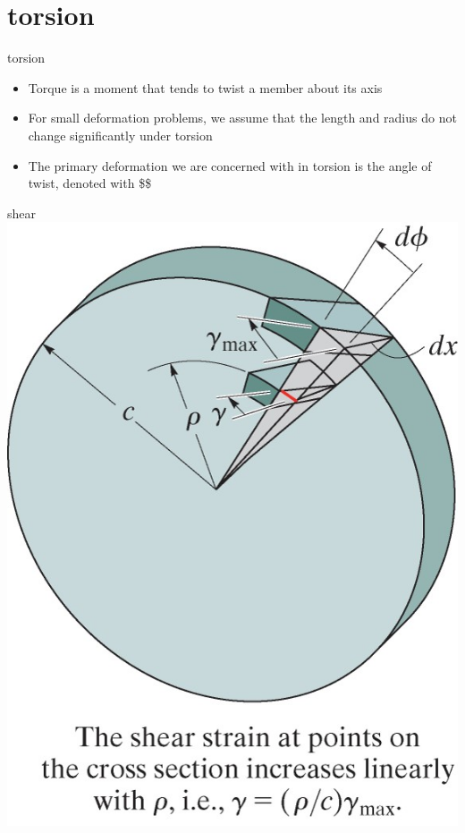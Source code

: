 \documentclass[
  letterpaper,
  ignorenonframetext,
  aspectratio=43,
  handout,
  12pt]{beamer}
\providecommand{\tightlist}{%
  \setlength{\itemsep}{0pt}\setlength{\parskip}{0pt}}
\providecommand{\tightlist}{%
\setlength{\itemsep}{0pt}\setlength{\parskip}{0pt}}
\let\Oldincludegraphics\includegraphics
\renewcommand{\includegraphics}[2][]{\Oldincludegraphics[width=\textwidth,height=0.7\textheight,keepaspectratio]{#2}}
\begin{document}
\hypertarget{torsion}{%
\section{torsion}\label{torsion}}

\begin{frame}{torsion}
\protect\hypertarget{torsion-1}{}
\begin{itemize}
\tightlist
\item
  Torque is a moment that tends to twist a member about its axis
\item
  For small deformation problems, we assume that the length and radius
  do not change significantly under torsion
\item
  The primary deformation we are concerned with in torsion is the angle
  of twist, denoted with \$\phi\$
\end{itemize}
\end{frame}

\begin{frame}{shear}
\protect\hypertarget{shear}{}
\includegraphics{../images/torsion-disk.jpg}
\end{frame}
\end{document}
